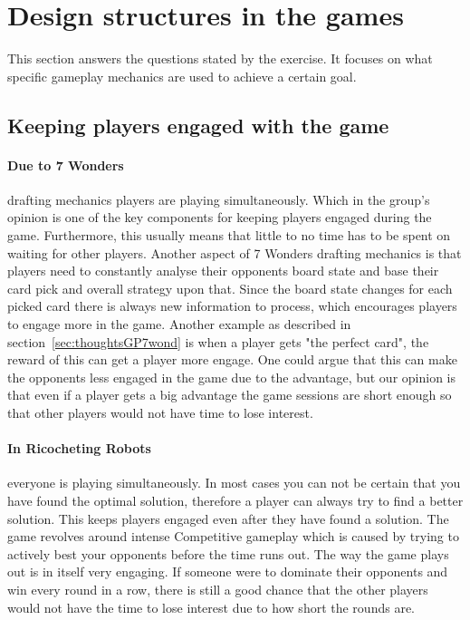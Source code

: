 \documentclass[a4paper]{article}
\begin{document}
\section{Design structures in the games}
This section answers the questions stated by the exercise. It focuses on what  specific gameplay mechanics are used to achieve a certain goal. 

\subsection{Keeping players engaged with the game}
\paragraph{Due to 7 Wonders} drafting mechanics players are playing simultaneously. Which in the group's opinion is one of the key components for keeping players engaged during the game. Furthermore, this usually means that little to no time has to be spent on waiting for other players. Another aspect of 7 Wonders drafting mechanics is that players need to constantly analyse their opponents board state and base their card pick and overall strategy upon that. Since the board state changes for each picked card there is always new information to process, which encourages players to engage more in the game.
Another example as described in section~\ref{sec:thoughtsGP7wond} is when a player gets "the perfect card", the reward of this can get a player more engage. One could argue that this can make the opponents less engaged in the game due to the advantage, but our opinion is that even if a player gets a big advantage the game sessions are short enough so that other players would not have time to lose interest.  

\paragraph{In Ricocheting Robots} everyone is playing simultaneously. In most cases you can not be certain that you have found the optimal solution, therefore a player can always try to find a better solution. This keeps players engaged even after they have found a solution. The game revolves around intense Competitive gameplay which is caused by trying to actively best your opponents before the time runs out. The way the game plays out is in itself very engaging. If someone were to dominate their opponents and win every round in a row, there is still a good chance that the other players would not have the time to lose interest due to how short the rounds are.
\end{document}
